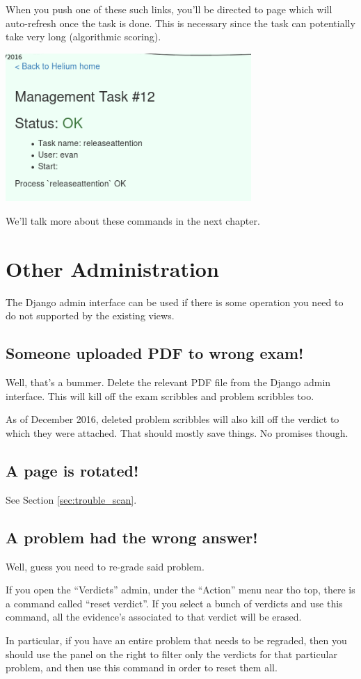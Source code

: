 When you push one of these such links, you'll be directed to page
which will auto-refresh once the task is done.
This is necessary since the task can potentially take very long
(algorithmic scoring).
\begin{center}
	\includegraphics[width=0.7\textwidth]{images/viewtask.png}
\end{center}

We'll talk more about these commands in the next chapter.

\section{Other Administration}
The Django admin interface can be used if there
is some operation you need to do not supported by the existing views.

\subsection{Someone uploaded PDF to wrong exam!}
Well, that's a bummer.
Delete the relevant PDF file from the Django admin interface.
This will kill off the exam scribbles and problem scribbles too.

As of December 2016, deleted problem scribbles will also kill
off the verdict to which they were attached.
That should mostly save things. No promises though.

\subsection{A page is rotated!}
See Section \ref{sec:trouble_scan}.

\subsection{A problem had the wrong answer!}
Well, guess you need to re-grade said problem.

If you open the ``Verdicts'' admin,
under the ``Action'' menu near tho top,
there is a command called ``reset verdict''.
If you select a bunch of verdicts and use this command,
all the evidence's associated to that verdict will be erased.

In particular, if you have an entire problem that needs to be regraded,
then you should use the panel on the right to filter
only the verdicts for that particular problem,
and then use this command in order to reset them all.
